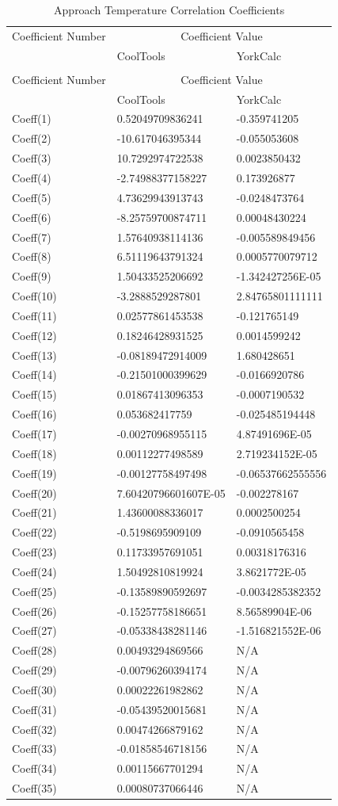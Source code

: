 \begin{longtable}[c]{p{2.0in}p{2.0in}p{2.0in}}

\caption{Approach Temperature Correlation Coefficients \label{table:approach-temperature-correlation-coefficients}} \tabularnewline
\toprule 
Coefficient Number & \multicolumn{2}{c}{Coefficient Value} \tabularnewline
\cmidrule(r){2-3}
& CoolTools & YorkCalc \tabularnewline
\midrule
\endfirsthead

\caption[]{Approach Temperature Correlation Coefficients} \tabularnewline
\toprule
Coefficient Number & \multicolumn{2}{c}{Coefficient Value} \tabularnewline
\cmidrule(r){2-3}
& CoolTools & YorkCalc \tabularnewline
\midrule
\endhead

Coeff(1) & 0.52049709836241 & -0.359741205 \tabularnewline
Coeff(2) & -10.617046395344 & -0.055053608 \tabularnewline
Coeff(3) & 10.7292974722538 & 0.0023850432 \tabularnewline
Coeff(4) & -2.74988377158227 & 0.173926877 \tabularnewline
Coeff(5) & 4.73629943913743 & -0.0248473764 \tabularnewline
Coeff(6) & -8.25759700874711 & 0.00048430224 \tabularnewline
Coeff(7) & 1.57640938114136 & -0.005589849456 \tabularnewline
Coeff(8) & 6.51119643791324 & 0.0005770079712 \tabularnewline
Coeff(9) & 1.50433525206692 & -1.342427256E-05 \tabularnewline
Coeff(10) & -3.2888529287801 & 2.84765801111111 \tabularnewline
Coeff(11) & 0.02577861453538 & -0.121765149 \tabularnewline
Coeff(12) & 0.18246428931525 & 0.0014599242 \tabularnewline
Coeff(13) & -0.08189472914009 & 1.680428651 \tabularnewline
Coeff(14) & -0.21501000399629 & -0.0166920786 \tabularnewline
Coeff(15) & 0.01867413096353 & -0.0007190532 \tabularnewline
Coeff(16) & 0.053682417759 & -0.025485194448 \tabularnewline
Coeff(17) & -0.00270968955115 & 4.87491696E-05 \tabularnewline
Coeff(18) & 0.00112277498589 & 2.719234152E-05 \tabularnewline
Coeff(19) & -0.00127758497498 & -0.06537662555556 \tabularnewline
Coeff(20) & 7.60420796601607E-05 & -0.002278167 \tabularnewline
Coeff(21) & 1.43600088336017 & 0.0002500254 \tabularnewline
Coeff(22) & -0.5198695909109 & -0.0910565458 \tabularnewline
Coeff(23) & 0.11733957691051 & 0.00318176316 \tabularnewline
Coeff(24) & 1.50492810819924 & 3.8621772E-05 \tabularnewline
Coeff(25) & -0.13589890592697 & -0.0034285382352 \tabularnewline
Coeff(26) & -0.15257758186651 & 8.56589904E-06 \tabularnewline
Coeff(27) & -0.05338438281146 & -1.516821552E-06 \tabularnewline
Coeff(28) & 0.00493294869566 & N/A \tabularnewline
Coeff(29) & -0.00796260394174 & N/A \tabularnewline
Coeff(30) & 0.00022261982862 & N/A \tabularnewline
Coeff(31) & -0.05439520015681 & N/A \tabularnewline
Coeff(32) & 0.00474266879162 & N/A \tabularnewline
Coeff(33) & -0.01858546718156 & N/A \tabularnewline
Coeff(34) & 0.00115667701294 & N/A \tabularnewline
Coeff(35) & 0.00080737066446 & N/A \tabularnewline
\bottomrule
\end{longtable}


